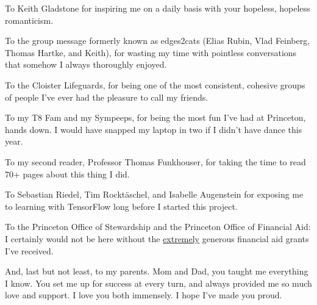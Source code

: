 To Keith Gladstone for inspiring me on a daily basis with your hopeless, hopeless romanticism.

To the group message formerly known as edges2cats (Elias Rubin, Vlad Feinberg, Thomas Hartke, and Keith), for wasting my time with pointless conversations that somehow I always thoroughly enjoyed.

To the Cloister Lifeguards, for being one of the most consistent, cohesive groups of people I've ever had the pleasure to call my friends.

To my T8 Fam and my Sympeeps, for being the most fun I've had at Princeton, hands down. I would have snapped my laptop in two if I didn't have dance this year.

To my second reader, Professor Thomas Funkhouser, for taking the time to read 70+ pages about this thing I did.

To Sebastian Riedel, Tim Rocktäschel, and Isabelle Augenstein for exposing me to learning with TensorFlow long before I started this project.

To the Princeton Office of Stewardship and the Princeton Office of Financial Aid: I certainly would not be here without the \underline{extremely} generous financial aid grants I've received.

And, last but not least, to my parents. Mom and Dad, you taught me everything I know. You set me up for success at every turn, and always provided me so much love and support. I love you both immensely. I hope I've made you proud.